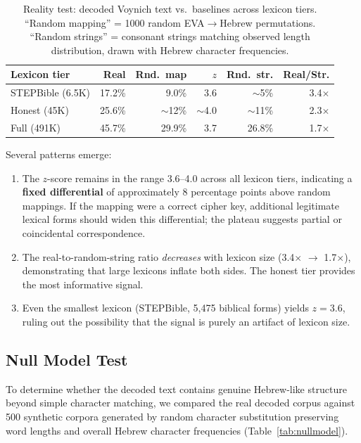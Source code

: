 \documentclass[11pt,a4paper]{article}
\begin{document}
\begin{table}[htbp]
\centering
\caption{Reality test: decoded Voynich text vs.\ baselines across lexicon
tiers. ``Random mapping'' = 1000 random EVA$\to$Hebrew permutations.
``Random strings'' = consonant strings matching observed length distribution,
drawn with Hebrew character frequencies.}
\label{tab:reality}
\small
\begin{tabular}{@{}lrrrrr@{}}
\toprule
Lexicon tier & Real & Rnd.\ map & $z$ & Rnd.\ str. & Real/Str. \\
\midrule
STEPBible (6.5K) & 17.2\% & 9.0\% & 3.6 & $\sim$5\% & 3.4$\times$ \\
Honest (45K) & 25.6\% & $\sim$12\% & $\sim$4.0 & $\sim$11\% & 2.3$\times$ \\
Full (491K) & 45.7\% & 29.9\% & 3.7 & 26.8\% & 1.7$\times$ \\
\bottomrule
\end{tabular}
\end{table}

Several patterns emerge:
\begin{enumerate}
\item The $z$-score remains in the range 3.6--4.0 across all lexicon tiers,
indicating a \textbf{fixed differential} of approximately 8 percentage points
above random mappings. If the mapping were a correct cipher key, additional
legitimate lexical forms should widen this differential; the plateau suggests
partial or coincidental correspondence.

\item The real-to-random-string ratio \emph{decreases} with lexicon size
(3.4$\times$ $\to$ 1.7$\times$), demonstrating that large lexicons inflate
both sides. The honest tier provides the most informative signal.

\item Even the smallest lexicon (STEPBible, 5,475 biblical forms) yields
$z=3.6$, ruling out the possibility that the signal is purely an artifact of
lexicon size.
\end{enumerate}

\subsection{Null Model Test}
\label{sec:nullmodel}

To determine whether the decoded text contains genuine Hebrew-like structure
beyond simple character matching, we compared the real decoded corpus against
500 synthetic corpora generated by random character substitution preserving
word lengths and overall Hebrew character frequencies
(Table~\ref{tab:nullmodel}).
\end{document}
